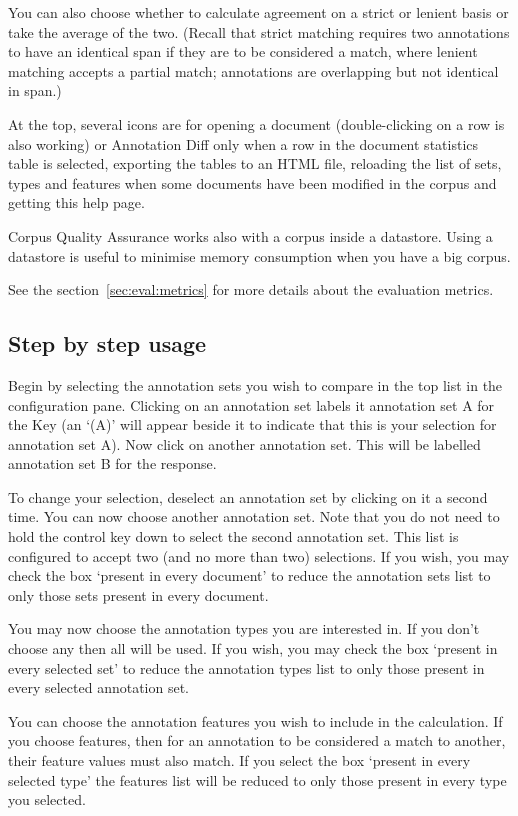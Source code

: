 You can also choose whether to calculate agreement
on a strict or lenient basis or take the average of the two. (Recall that strict
matching requires two annotations to have an identical span if they are to be
considered a match, where lenient matching accepts a partial match; annotations
are overlapping but not identical in span.)

At the top, several icons are for opening a document (double-clicking on a
row is also working) or Annotation Diff only when a row in the document
statistics table is selected, exporting the tables to an HTML file,
reloading the list of sets, types and features when some documents have been
modified in the corpus and getting this help page.

Corpus Quality Assurance works also with a corpus inside a datastore. Using a
datastore is useful to minimise memory consumption when you have a big
corpus.

See the section~\ref{sec:eval:metrics} for more details about the evaluation
metrics.

\subsection{Step by step usage}

Begin by selecting the annotation sets you wish to compare in the top list
in the configuration pane. Clicking on an annotation set labels it
annotation set A for the Key (an `(A)' will appear beside it to indicate
that this is your selection for annotation set A). Now click on another
annotation set. This will be labelled annotation set B for the response.

To change your selection, deselect an annotation set by
clicking on it a second time. You can now choose another annotation set. Note
that you do not need to hold the control key down to select the second
annotation set. This list is configured to accept two (and no more than two)
selections. If you wish, you may check the box `present in every document' to
reduce the annotation sets list to only those sets present in every document.

You may now choose the annotation types you are interested in. If you don't
choose any then all will be used. If you wish, you may check the box
`present in every selected set' to reduce the annotation types list to only
those present in every selected annotation set.

You can choose the annotation features you wish to include in the
calculation. If you choose features, then for an annotation to be considered
a match to another, their feature values must also match. If you select the
box `present in every selected type' the features list will be reduced to
only those present in every type you selected.

